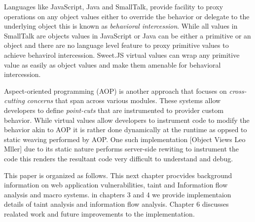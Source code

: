 Languages like JavaScript, Java and SmallTalk, provide facility to proxy operations on any object values either to override the behavior or delegate to the underlying object this is known as \textit{behavioral intercession}. While all values in SmallTalk are objects values in JavaScript or Java can be either a primitive or an object and there are no language level feature to proxy primitive values to achieve behavirol intercession. Sweet.JS virtual values can wrap any primitive value as easily as object values and make them amenable for behavioral intercession.

Aspect-oriented programming (AOP) is another approach that focuses on \textit{cross-cutting concerns} that span across various modules. These systems allow developers to define \textit{point-cuts} that are instrumented to provider custom behavior.  While virtual values allow developers to instrument code to modify the behavior akin to AOP it is rather done dynamically at the runtime  as oppsed to static weaving performed by AOP.  One such implementation [Object Views Leo  Mller] due to its static nature performs server-side rewiting to instrument the code this renders the resultant code very difficult to understand and debug.

This paper is organized as follows. This next chapter procvides background information on web application vulnerabilities, taint and Information flow analysis and macro systems. in chapters 3 and 4 we provide implementaion details of taint analysis and information flow analysis. Chapter 6 discusses realated work and future improvements to the implementation.
